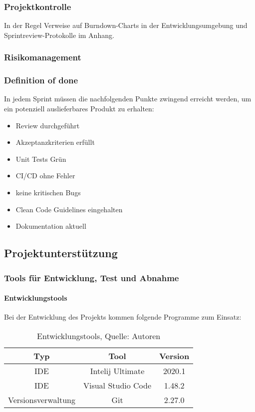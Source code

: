 \documentclass[12pt,titlepage]{article}
\begin{document}
\subsubsection{Projektkontrolle}
In der Regel Verweise auf Burndown-Charts in der Entwicklungsumgebung und Sprintreview-Protokolle im Anhang.
\subsubsection{Risikomanagement}
\subsubsection{Definition of done}
In jedem Sprint müssen die nachfolgenden Punkte zwingend erreicht werden, um ein potenziell auslieferbares Produkt zu erhalten:

\begin{itemize}
\item Review durchgeführt
\item Akzeptanzkriterien erfüllt
\item Unit Tests Grün
\item CI/CD ohne Fehler
\item keine kritischen Bugs
\item Clean Code Guidelines eingehalten
\item Dokumentation aktuell
\end{itemize}
\subsection{Projektunterst\"utzung}
\subsubsection{Tools f\"ur Entwicklung, Test und Abnahme}
\paragraph{Entwicklungstools}
Bei der Entwicklung des Projekts kommen folgende Programme zum Einsatz: 

\begin{table}[H]
\setlength\extrarowheight{2pt} %
\begin{tabularx}{\textwidth}{|C|C|C|}
\hline
\textbf{Typ} &\textbf{Tool} & \textbf{Version}  \\

\hline
IDE & Intelij Ultimate  & 2020.1\\
\hline
IDE & Visual Studio Code & 1.48.2\\
\hline
Versionsverwaltung & Git & 2.27.0\\
\hline
\end{tabularx}
\caption{ \label{tbl: Entwicklungstools}Entwicklungstools, Quelle: Autoren}
\end{table}
\end{document}
